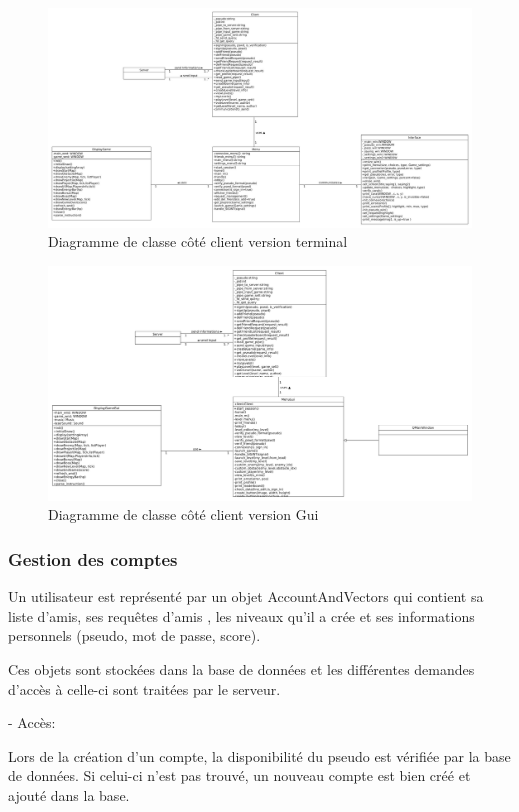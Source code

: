 \documentclass[a4paper,12pt]{article}
\begin{document}
\begin{figure}
\centering
\includegraphics[scale=0.3, angle=90]{images/newClientClassDiagram.jpg}
\caption{Diagramme de classe côté client version terminal}
\end{figure}
\begin{figure}
\centering
\includegraphics[scale=0.3, angle=90]{images/newClientGUIClassDiagram.png}
\caption{Diagramme de classe côté client version Gui}
\end{figure}
\newpage


\subsubsection{Gestion des comptes}
Un utilisateur est représenté  par un objet AccountAndVectors
qui contient sa liste d'amis, ses requêtes d'amis , les niveaux qu'il a crée et ses informations personnels (pseudo, mot de passe, score).

Ces objets sont stockées dans la base de données et les différentes demandes d'accès à celle-ci sont traitées par le serveur.

- Accès:

Lors de la création d'un compte, la disponibilité du pseudo est vérifiée par la base de données. Si celui-ci n'est pas trouvé, un nouveau compte est bien créé et ajouté dans la base.
\end{document}
